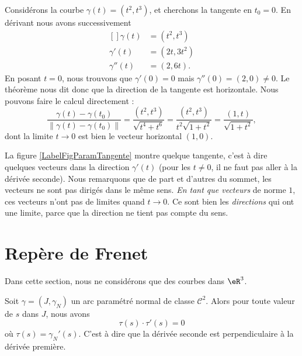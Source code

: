 \begin{example}
Considérons la courbe $\gamma(t)=(t^2,t^3)$, et cherchons la tangente en $t_0=0$. En dérivant nous avons successivement 
\begin{equation}
    \begin{aligned}[]
        \gamma(t)&=(t^2,t^3)\\
        \gamma'(t)&=(2t,3t^2)\\
        \gamma''(t)&=(2,6t).
    \end{aligned}
\end{equation}
En posant $t=0$, nous trouvons que $\gamma'(0)=0$ mais $\gamma''(0)=(2,0)\neq 0$. Le théorème nous dit donc que la direction de la tangente est horizontale. Nous pouvons faire le calcul directement :
\begin{equation}
    \frac{ \gamma(t)-\gamma(t_0) }{ \| \gamma(t)-\gamma(t_0) \| }=\frac{ (t^2,t^3) }{ \sqrt{t^4+t^6} }=\frac{ (t^2,t^3) }{ t^2\sqrt{1+t^2} }=\frac{ (1,t) }{ \sqrt{1+t^2} },
\end{equation}
dont la limite \( t\to 0\) est bien le vecteur horizontal $(1,0)$.

La figure \ref{LabelFigParamTangente} montre quelque tangente, c'est à dire quelques vecteurs dans la direction $\gamma'(t)$ (pour les $t\neq 0$, il ne faut pas aller à la dérivée seconde). Nous remarquons que de part et d'autres du sommet, les vecteurs ne sont pas dirigés dans le même sens. \emph{En tant que vecteurs} de norme $1$, ces vecteurs n'ont pas de limites quand $t\to 0$. Ce sont bien les \emph{directions} qui ont une limite, parce que la direction ne tient pas compte du sens.
\newcommand{\CaptionFigParamTangente}{Quelques tangentes de la courbe $\gamma(t)=(t^2,t^3)$.}


\end{example}

\section{Repère de Frenet}      \label{SecFrenet}

Dans cette section, nous ne considérons que des courbes dans $\eR^3$.

\begin{proposition}     \label{Proptausclataupzero}
    Soit $\gamma=(J,\gamma_N)$ un arc paramétré normal de classe $\mathcal{C}^2$. Alors pour toute valeur de $s$ dans $J$, nous avons
    \begin{equation}
        \tau(s)\cdot\tau'(s)=0
    \end{equation}
    où $\tau(s)=\gamma_N'(s)$. C'est à dire que la dérivée seconde est perpendiculaire à la dérivée première.
\end{proposition}


